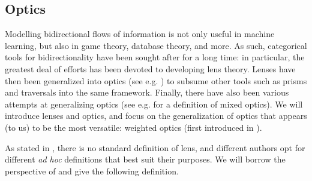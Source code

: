 \documentclass[11pt,a4paper,openright,twoside]{report}
\theoremstyle{plain}
\theoremstyle{definition}
\begin{document}
\subsection{Optics}

Modelling bidirectional flows of information is not only useful in machine learning, but also in game theory, database theory, and more. As such, categorical tools for bidirectionality have been sought after for a long time: in particular, the greatest deal of efforts has been devoted to developing lens theory. Lenses have then been generalized into optics (see e.g. \cite{riley2018categories}) to subsume other tools such as prisms and traversals into the same framework. Finally, there have also been various attempts at generalizing optics (see e.g. \cite{clarke2024profunctor} for a definition of mixed optics). We will introduce lenses and optics, and focus on the generalization of optics that appears (to us) to be the most versatile: weighted optics (first introduced in \cite{gavranovic2024fundamental}). 


As stated in \cite{gavranovic2024fundamental}, there is no standard definition of lens, and different authors opt for different \textit{ad hoc} definitions that best suit their purposes. We will borrow the perspective of \cite{cruttwell2022categorical} and give the following definition.
\end{document}
